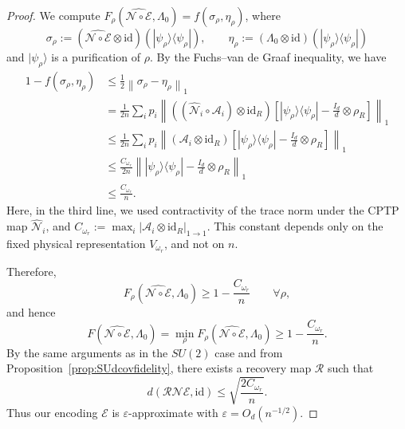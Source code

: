 \documentclass[10pt,twocolumn,superscriptaddress,aps,amsmath,amssymb,citeautoscript,floatfix,prx]{revtex4-2}
\theoremstyle{plain}
\theoremstyle{plain}
\theoremstyle{plain}
\theoremstyle{plain}
\theoremstyle{plain}
\theoremstyle{plain}
\theoremstyle{plain}
\theoremstyle{definition}
\theoremstyle{plain}
\begin{document}
\begin{appendix}
\begin{proof}
We compute \(F_\rho(\widehat{\mathcal{N} \circ \mathcal{E}},\Lambda_0)=f(\sigma_\rho,\eta_\rho)\), where
\[
\sigma_\rho
:=
(\widehat{\mathcal{N}\circ\mathcal{E}}\otimes \mathrm{id})
(|\psi_\rho\rangle\langle\psi_\rho|),
\qquad
\eta_\rho
:=
(\Lambda_0\otimes \mathrm{id})
(|\psi_\rho\rangle\langle\psi_\rho|)
\]
and \(|\psi_\rho\rangle\) is a purification of \(\rho\). By the Fuchs--van de Graaf inequality, we have
\[
\begin{aligned}
1-f(\sigma_\rho,\eta_\rho)
&\leq
\frac{1}{2}\left\|\sigma_\rho-\eta_\rho\right\|_1 \\
&=
\frac{1}{2n}
\sum_i p_i
\left\|
\left((\widehat{\mathcal N}_i\circ \mathcal A_i)\otimes \mathrm{id}_R\right)
\left[
|\psi_\rho\rangle\langle\psi_\rho|
-
\frac{I_d}{d}\otimes \rho_R
\right]
\right\|_1 \\
&\leq
\frac{1}{2n}
\sum_i p_i
\left\|
(\mathcal A_i\otimes \mathrm{id}_R)
\left[
|\psi_\rho\rangle\langle\psi_\rho|
-
\frac{I_d}{d}\otimes \rho_R
\right]
\right\|_1 \\
&\leq
\frac{C_{\omega_r}}{2n}
\left\|
|\psi_\rho\rangle\langle\psi_\rho|
-
\frac{I_d}{d}\otimes \rho_R
\right\|_1 \\
&\leq
\frac{C_{\omega_r}}{n}.
\end{aligned}
\]
Here, in the third line, we used contractivity of the trace norm under the CPTP map \(\widehat{\mathcal N}_i\), 
and \(C_{\omega_r}:=\max_i|\mathcal A_i\otimes \mathrm{id}_R|_{1\to 1}\). 
This constant depends only on the fixed physical representation \(V_{\omega_r}\), and not on \(n\).

Therefore,
\[
F_\rho(\widehat{\mathcal{N} \circ \mathcal{E}},\Lambda_0)
\geq
1-\frac{C_{\omega_r}}{n}
\qquad
\forall \rho ,
\]
and hence
\[
F(\widehat{\mathcal{N} \circ \mathcal{E}},\Lambda_0)
=
\min_\rho F_\rho(\widehat{\mathcal{N} \circ \mathcal{E}},\Lambda_0)
\geq
1-\frac{C_{\omega_r}}{n}.
\]
By the same arguments as in the \(SU(2)\) case and from Proposition~\ref{prop:SUdcovfidelity}, there exists a recovery map \(\mathcal R\) such that
\[
d(\mathcal R\mathcal N\mathcal E,\mathrm{id})
\leq
\sqrt{\frac{2C_{\omega_r}}{n}}.
\]
Thus our encoding \(\mathcal E\) is \(\varepsilon\)-approximate with \(\varepsilon=O_{d}(n^{-1/2})\).

\end{proof}


\end{appendix}
\end{document}
